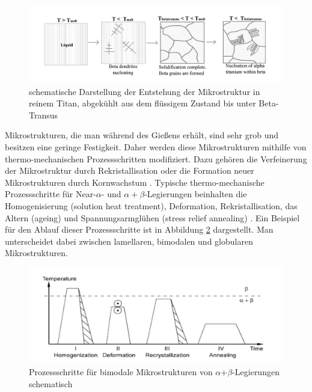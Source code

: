 \pagebreak

\begin{figure}[h]
	\centering
	\includegraphics[width=0.8\linewidth]{./Bilder/Abbildung 6}
	\caption[Abbildung 6]{schematische Darstellung der Entstehung der Mikrostruktur in reinem Titan, abgekühlt aus dem flüssigem Zustand bis unter Beta-Transus \cite{M.J.Berminghametal..2007}}
	\label{fig:abbildung-6}
\end{figure}


Mikrostrukturen, die man während des Gießens erhält, sind sehr grob und besitzen eine geringe Festigkeit. Daher werden diese Mikrostrukturen mithilfe von thermo-mechanischen Prozessschritten modifiziert. Dazu gehören die Verfeinerung der Mikrostruktur durch Rekristallisation oder die Formation neuer Mikrostrukturen durch Kornwachstum \cite{C.Leyens.2005,Lutjering.2007,Boyer.2007,M.J.Donachie.2010}.
Typische thermo-mechanische Prozessschritte für Near-$\alpha$- und $\alpha+\beta$-Legierungen beinhalten die Homogenisierung (solution heat treatment), Deformation, Rekristallisation, das Altern (ageing) und Spannungsarmglühen (stress relief annealing) \cite{C.Leyens.2005,Lutjering.2007,Boyer.2007}. Ein Beispiel für den Ablauf dieser Prozessschritte ist in Abbildung \ref{fig:abbildung-7} dargestellt. Man unterscheidet dabei zwischen lamellaren, bimodalen und globularen Mikrostrukturen. 

\begin{figure}[h]
	\centering
	\includegraphics[width=0.9\linewidth]{./Bilder/Abbildung 7}
	\caption[Abbildung 7]{Prozessschritte für bimodale Mikrostrukturen von $\alpha$+$\beta$-Legierungen schematisch \cite{M.PetersJ.KumpfertC.WardC.Leyens.2003}}
	\label{fig:abbildung-7}
\end{figure}

